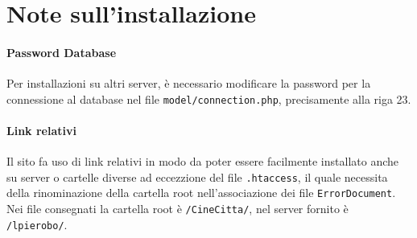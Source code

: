 \section{Note sull'installazione}

\paragraph{Password Database} Per installazioni su altri server, è necessario modificare la password per la connessione al database nel file \texttt{model/connection.php}, precisamente alla riga 23.

\paragraph{Link relativi} Il sito fa uso di link relativi in modo da poter essere facilmente installato anche su server o cartelle diverse ad eccezzione del file \texttt{.htaccess}, il quale necessita della rinominazione della cartella root nell'associazione dei file \texttt{ErrorDocument}.
Nei file consegnati la cartella root è \texttt{/CineCitta/}, nel server fornito è \texttt{/lpierobo/}.